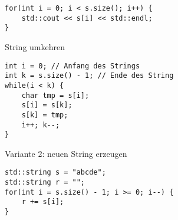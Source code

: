 \documentclass[a4paper]{scrartcl}
\begin{document}
\begin{itemize}
\begin{itemize}
\begin{itemize}
\begin{verbatim}
for(int i = 0; i < s.size(); i++) {
	std::cout << s[i] << std::endl;
}
\end{verbatim}
String umkehren
\begin{verbatim}
int i = 0; // Anfang des Strings
int k = s.size() - 1; // Ende des String
while(i < k) {
	char tmp = s[i];
	s[i] = s[k];
	s[k] = tmp;
	i++; k--;
}
\end{verbatim}
Variante 2: neuen String erzeugen
\begin{verbatim}
std::string s = "abcde";
std::string r = "";
for(int i = s.size() - 1; i >= 0; i--) {
	r += s[i];
}
\end{verbatim}
\end{itemize}
\end{itemize}
\end{itemize}
\end{document}
